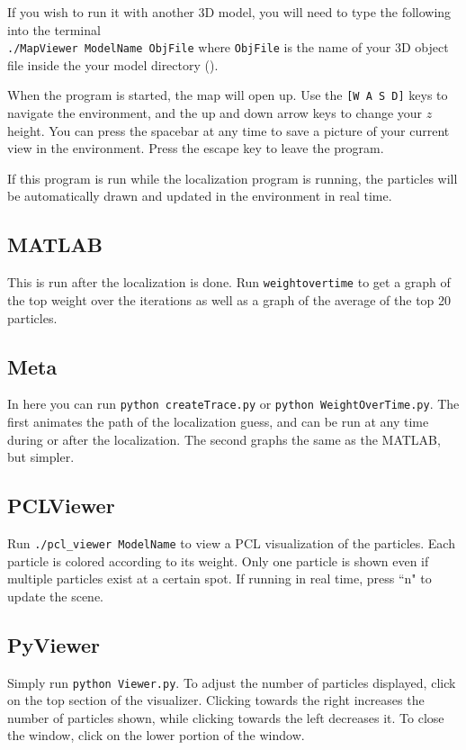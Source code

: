 \documentclass[11pt]{article}
\begin{document}
  If you wish to run it with another 3D model, you will need to type the following into the terminal \\
  \verb,./MapViewer ModelName ObjFile, where \verb.ObjFile. is the name of your 3D object file inside the your model directory ().

  When the program is started, the map will open up. Use the \texttt{[W A S D]} keys to navigate the environment, and the up and down arrow keys to change your $z$ height. You can press the spacebar at any time to save a picture of your current view in the environment. Press the escape key to leave the program.

  If this program is run while the localization program is running, the particles will be automatically drawn and updated in the environment in real time.

\subsection{MATLAB}
This is run after the localization is done. Run \verb.weightovertime. to get a graph of the top weight over the iterations as well as a graph of the average of the top 20 particles.
\subsection{Meta}
In here you can run \verb`python createTrace.py` or \verb`python WeightOverTime.py`. The first animates the path of the localization guess, and can be run at any time during or after the localization. The second graphs the same as the MATLAB, but simpler.
\subsection{PCLViewer}
Run \verb`./pcl_viewer ModelName` to view a PCL visualization of the particles. Each particle is colored according to its weight. Only one particle is shown even if multiple particles exist at a certain spot. If running in real time, press ``n" to update the scene.
\subsection{PyViewer}
Simply run \verb`python Viewer.py`. To adjust the number of particles displayed, click on the top section of the visualizer. Clicking towards the right increases the number of particles shown, while clicking towards the left decreases it. To close the window, click on the lower portion of the window.
\end{document}
